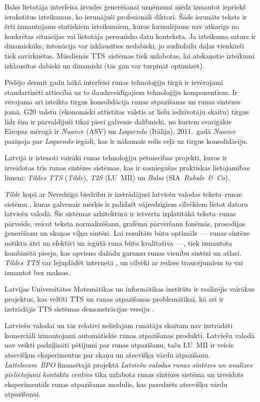 \begin{multicols}{2}
Balss lietotāja interfeisa izvades ģenerēšanai uzņēmumi mēdz izmantot iepriekš ierakstītus izteikumus, ko ierunājuši profesionāli diktori.
Šāds ierunāts teksts ir ērti izmantojams statiskiem izteikumiem, kuros formulējums nav atkarīgs no konkrētas situācijas vai lietotāja personisko datu konteksta.
Ja izteikuma saturs ir dinamiskāks, intonācija var izklausīties nedabiski, jo audiofailu daļas vienkārši tiek savirknētas.
Mūsdienās TTS~sistēmas tiek uzlabotas, lai atskaņotie izteikumi izklausītos dabiski un dinamiski (tās gan var turpināt optimizēt).

Pēdējo desmit gadu laikā interfeisi runas tehnoloģiju tirgū ir ievērojami standartizēti attiecībā uz to daudzveidīgajiem tehnoloģiju komponentiem.
Ir vērojama arī izteikta tirgus konsolidācija runas atpazīšanas un runas sintēzes jomā.
G20 valstu (ekonomiski attīstītas valstis ar lielu iedzīvotāju skaitu) tirgus līdz šim ir pārvaldījuši tikai pieci galvenie dalībnieki, no kuriem svarīgākie Eiropas mērogā ir \textit{Nuance} (ASV) un \textit{Loquendo} (Itālija).
2011.~gadā \textit{Nuance} paziņoja par \textit{Loquendo} iegādi, kas ir nākamais solis ceļā uz tirgus konsolidāciju.

Latvijā ir īstenoti vairāki runas tehnoloģiju pētniecības projekti, kuros ir izveidotas trīs runas sintēzes sistēmas, kas ir sasniegušas praktiskas lietojamības līmeni: \textit{Tildes TTS} (\textit{Tilde}), \textit{T2S} (LU~MII) un \textit{Balss} (SIA\textit{~Rubuls~\&~Co}). 

\textit{Tilde} kopā ar Neredzīgo biedrību ir izstrādājusi latviešu valodas teksta--runas sistēmu \cite{Meta19}, kuras galvenais mērķis ir palīdzēt vājredzīgiem cilvēkiem lietot datoru latviešu valodā.
Šīs sistēmas arhitektūrā ir ietverta izplatītākā teksta--runas pārveide, veicot teksta normalizēšanu, grafēmu pārvēršanu fonēmās, prosodijas ģenerēšanu un skaņas viļņu sintēzi.
Lai rezultāts būtu optimāls~--- runas sintēze notiktu ātri un efektīvi un iegūtā runa būtu kvalitatīva~---, tiek izmantota kombinētā pieeja, kas apvieno dažādu garumu runas vienību sintēzi un atlasi. 
\textit{Tildes TTS} var lejuplādēt internetā \cite{Meta58}, un cilvēki ar redzes traucējumiem to var izmantot bez maksas.

Latvijas Universitātes Matemātikas un informātikas institūts ir realizējis vairākus projektus, kas veltīti TTS \cite{Meta20, Meta21} un runas atpazīšanas problemātikai, kā arī ir izstrādājis TTS sistēmas demonstrācijas versiju \cite{Meta22}.

Latviešu valodai un tās relatīvi nelielajam runātāju skaitam nav izstrādāti komerciāli izmantojami automātiskie runas atpazīšanas produkti.
Latviešu valodā nav veikti padziļināti pētījumi par runas atpazīšanu, taču LU~MII ir veicis atsevišķus eksperimentus par skaņu un atsevišķu vārdu atpazīšanu.
\textit{Lattelecom~BPO} finansētajā projektā \textit{Latviešu valodas runas sintēzes un analīzes pielietojumi kontaktu centros} tika uzlabota runas sintēzes sistēma un izveidots eksperimentāls runas atpazīšanas modulis, kas paredzēts atsevišķu vārdu atpazīšanai.


\end{multicols}
